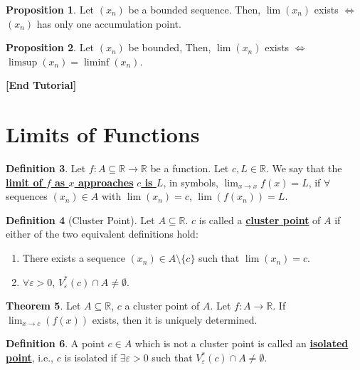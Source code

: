 \documentclass[reqno,11pt]{amsart}
\theoremstyle{definition}
\newtheorem{theorem}{Theorem}
\newtheorem{prop}[theorem]{Proposition}
\theoremstyle{definition}
\newtheorem{definition}[theorem]{Definition}
\theoremstyle{remark}
\newcommand{\R}{\mathbb{R}}
\newcommand{\eps}{\varepsilon}
\newcommand{\dfn}[1]{\underline{\textbf{#1}}}
\begin{document}
\begin{prop}
	Let $(x_n)$ be a bounded sequence. Then, $\lim(x_n)$ exists $\iff$ $(x_n)$ has only one accumulation point.
\end{prop}

\begin{prop}
	Let $(x_n)$ be bounded, Then, $\lim(x_n)$ exists $\iff$ $\limsup(x_n) = \liminf(x_n)$.
\end{prop}

\begin{center}
	\textbf{[End Tutorial]}
\end{center}

\section{Limits of Functions}

\begin{definition}
	Let $f: A \subseteq \R \rightarrow \R$ be a function. Let $c, L \in \R$. We say that the \dfn{limit of $f$ as $x$ approaches} \dfn{$c$ is $L$}, in symbols, $\lim_{x \rightarrow x}f(x) = L$, if $\forall$ sequences $(x_n) \in A$ with $\lim(x_n) = c$, $\lim (f(x_n)) = L$.
\end{definition}

\begin{definition}[Cluster Point]
	Let $A \subseteq \R$. $c$ is called a \dfn{cluster point} of $A$ if either of the two equivalent definitions hold: 
	\begin{enumerate}[noitemsep]
		\item There exists a sequence $(x_n) \in A \setminus \{ c \}$ such that $\lim (x_n) = c$.
		\item $\forall \eps > 0$, $V_\eps^*(c) \cap A \neq \emptyset$.
	\end{enumerate}	
\end{definition}

\begin{theorem}
	Let $A \subseteq \R$, $c$ a cluster point of $A$. Let $f: A \rightarrow \R$. If $\lim_{x \rightarrow c} (f(x)) $ exists, then it is uniquely determined.
\end{theorem}

\begin{definition}
	A point $c \in A$ which is not a cluster point is called an \dfn{isolated point}, i.e., $c$ is isolated if $\exists \eps > 0$ such that $V_\eps^*(c) \cap A \neq \emptyset$.
\end{definition}
\end{document}
